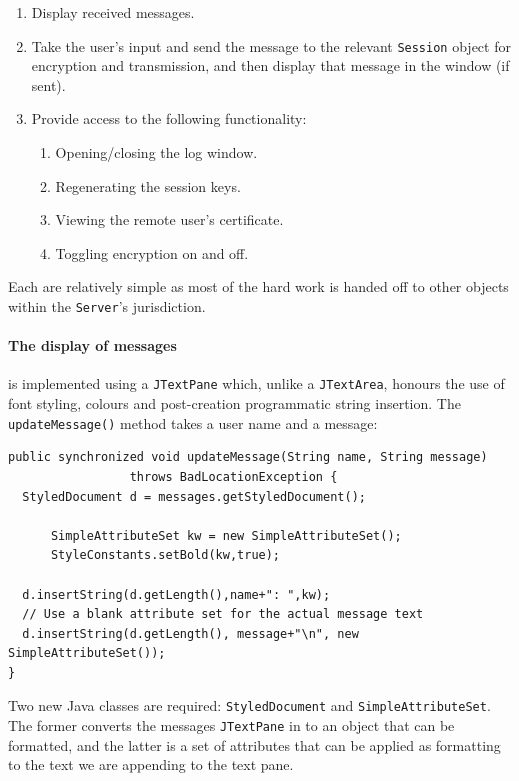     \begin{enumerate}
      \item Display received messages.
      \item Take the user's input and send the message to the relevant \verb!Session! object for encryption and transmission, and then display that message in the window (if sent).
      \item Provide access to the following functionality:
        \begin{enumerate}
          \item Opening/closing the log window.
          \item Regenerating the session keys.
          \item Viewing the remote user's certificate.
          \item Toggling encryption on and off.
        \end{enumerate}
    \end{enumerate}
    
    Each are relatively simple as most of the hard work is handed off to other objects within the \verb!Server!'s jurisdiction. 
    
    \paragraph{The display of messages} is implemented using a \verb!JTextPane! which, unlike a \verb!JTextArea!, honours the use of font styling, colours and post-creation programmatic string insertion. The \verb!updateMessage()! method takes a user name and a message: \\
    
    \begin{lstlisting}
public synchronized void updateMessage(String name, String message)
                 throws BadLocationException {
  StyledDocument d = messages.getStyledDocument();
      
      SimpleAttributeSet kw = new SimpleAttributeSet();
      StyleConstants.setBold(kw,true);
      
  d.insertString(d.getLength(),name+": ",kw);
  // Use a blank attribute set for the actual message text
  d.insertString(d.getLength(), message+"\n", new SimpleAttributeSet());
}
\end{lstlisting}
    
    Two new Java classes are required: \verb!StyledDocument! and \verb!SimpleAttributeSet!. The former converts the messages \verb!JTextPane! in to an object that can be formatted, and the latter is a set of attributes that can be applied as formatting to the text we are appending to the text pane. 
    

